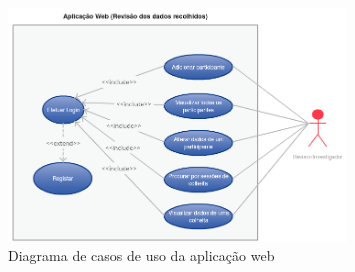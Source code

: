 \begin{figure}[H]
  \centering
  \includegraphics[width=0.8\textwidth]{imgs/app-web-usecase.png}
  \caption[Diagrama de casos de uso da aplicação web]{Diagrama de casos de uso da aplicação web}
  
  \label{f:usecasewebapp}
\end{figure}



